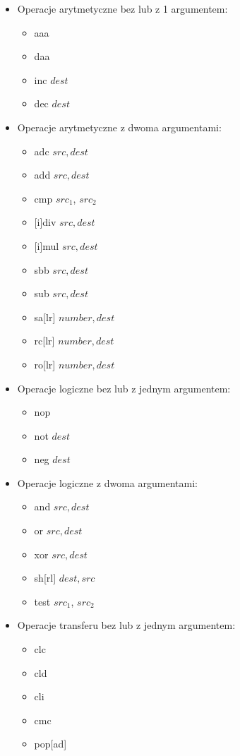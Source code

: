 \documentclass[a4paper,12pt]{article}
\begin{document}
\begin{itemize}
\item Operacje arytmetyczne bez lub z 1 argumentem:
	\begin{itemize}
	\item aaa
	\item daa
	\item inc $dest$
	\item dec $dest$
	\end{itemize}
\item Operacje arytmetyczne z dwoma argumentami:
	\begin{itemize}
	\item adc $src, dest$
	\item add $src, dest$
	\item cmp $src_1$, $src_2$ 
	\item {[i]}div $src, dest$
	\item {[i]}mul $src, dest$
	\item sbb $src, dest$
	\item sub $src, dest$
	\item sa[lr] $number, dest$
	\item rc[lr] $number, dest$
	\item ro[lr] $number, dest$ 
	\end{itemize}
\item Operacje logiczne bez lub z jednym argumentem:
	\begin{itemize}
	\item nop 
	\item not $dest$
	\item neg $dest$
	\end{itemize}
\item Operacje logiczne z dwoma argumentami:
	\begin{itemize}
	\item and $src, dest$
	\item or $src, dest$
	\item xor $src, dest$
	\item sh[rl] $dest, src$
	\item test $src_1$, $src_2$
	\end{itemize}
\item Operacje transferu bez lub z jednym argumentem:
	\begin{itemize}
	\item clc
	\item cld
	\item cli
	\item cmc
	\item pop[ad]

\end{itemize}
\end{itemize}
\end{document}
